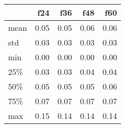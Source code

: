 \begin{tabular}{lrrrr}
\toprule
{} &  f24 &  f36 &  f48 &  f60 \\
\midrule
mean & 0.05 & 0.05 & 0.06 & 0.06 \\
std  & 0.03 & 0.03 & 0.03 & 0.03 \\
min  & 0.00 & 0.00 & 0.00 & 0.00 \\
25\%  & 0.03 & 0.03 & 0.04 & 0.04 \\
50\%  & 0.05 & 0.05 & 0.05 & 0.06 \\
75\%  & 0.07 & 0.07 & 0.07 & 0.07 \\
max  & 0.15 & 0.14 & 0.14 & 0.14 \\
\bottomrule
\end{tabular}
